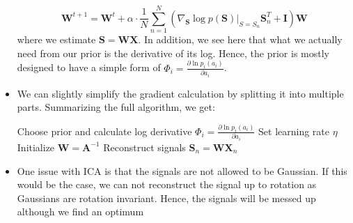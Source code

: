 \begin{itemize}
	$$\bm{W}^{t+1}=\bm{W}^{t} + \alpha \cdot \frac{1}{N}\sum_{n=1}^{N}\left(\nabla_{\bm{S}} \log p(\bm{S})\Big\vert_{S=S_n}\bm{S}_n^T+\bm{I}\right)\bm{W}$$
	where we estimate $\bm{S}=\bm{W}\bm{X}$. In addition, we see here that what we actually need from our prior is the derivative of its log. Hence, the prior is mostly designed to have a simple form of $\Phi_i=\frac{\partial \ln p_i(a_i)}{\partial a_i}$.
	\item We can slightly simplify the gradient calculation by splitting it into multiple parts. Summarizing the full algorithm, we get:
	\begin{tcolorbox}[colback=white!85!gray,colframe=gray!75!black,title=Independent Component Analysis]
		\begin{algorithm}[H]
			\SetAlgoLined
			Choose prior and calculate log derivative $\Phi_i=\frac{\partial \ln p_i(a_i)}{\partial a_i}$\;
			Set learning rate $\eta$\;
			Initialize $\bm{W}=\bm{A}^{-1}$\;
			Reconstruct signals $\bm{S}_n=\bm{W}\bm{X}_n$\;
		\end{algorithm}
	\end{tcolorbox} 
	\item One issue with ICA is that the signals are not allowed to be Gaussian. If this would be the case, we can not reconstruct the signal up to rotation as Gaussians are rotation invariant. Hence, the signals will be messed up although we find an optimum
\end{itemize}

